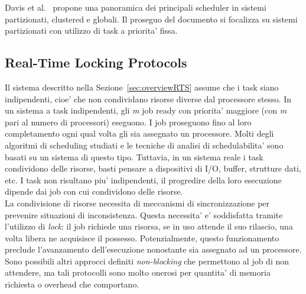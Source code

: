 Davis et al.~\cite{Davis:2011:SHR:1978802.1978814} propone una panoramica dei principali scheduler in sistemi partizionati, clustered e globali. Il proseguo del documento si focalizza su sistemi partizionati con utilizzo di task a priorita' fissa.\\

\subsection{Real-Time Locking Protocols}
\label{sec:lockProtocols}

Il sistema descritto nella Sezione~\ref{sec:overviewRTS} assume che i task siano indipendenti, cioe' che non condividano risorse diverse dal processore stesso. In un sistema a task indipendenti, gli \textit{m} job ready con priorita' maggiore (con \textit{m} pari al numero di processori) eseguono. I job proseguono fino al loro completamento ogni qual volta gli sia assegnato un processore. Molti degli algoritmi di scheduling studiati e le tecniche di analisi di schedulabilita' sono basati su un sistema di questo tipo. Tuttavia, in un sistema reale i task condividono delle risorse, basti pensare a dispositivi di I/O, buffer, strutture dati, etc. I task non risultano piu' indipendenti, il progredire della loro esecuzione dipende dai job con cui condividono delle risorse.\\

La condivisione di risorse necessita di meccanismi di sincronizzazione per prevenire situazioni di inconsistenza. Questa necessita' e' soddisfatta tramite l'utilizzo di \textit{lock}: il job richiede una risorsa, se in uso attende il suo rilascio, una volta libera ne acquisisce il possesso. Potenzialmente, questo funzionamento preclude l'avanzamento dell'esecuzione nonostante sia assegnato ad un processore. Sono possibili altri approcci definiti \textit{non-blocking} che permettono al job di non attendere, ma tali protocolli sono molto onerosi per quantita' di memoria richiesta o overhead che comportano.\\

